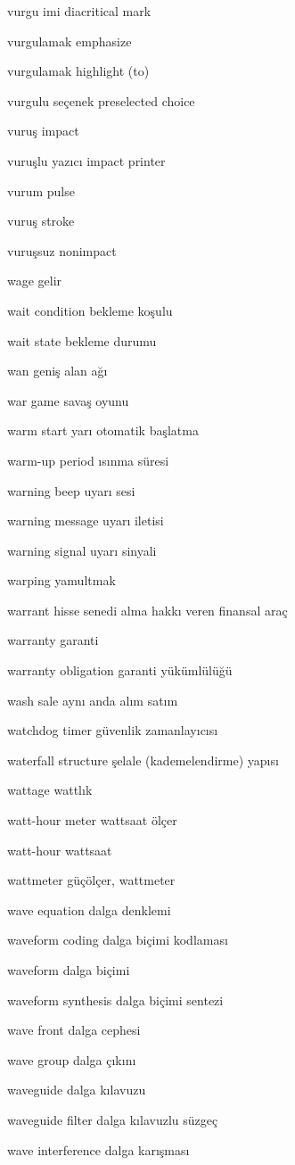 \documentclass[12pt,fleqn]{article}\usepackage{../../common}
\begin{document}
vurgu imi diacritical mark

vurgulamak emphasize

vurgulamak highlight (to)

vurgulu seçenek preselected choice

vuruş impact

vuruşlu yazıcı impact printer

vurum pulse

vuruş stroke

vuruşsuz nonimpact

wage gelir

wait condition bekleme koşulu

wait state bekleme durumu

wan geniş alan ağı

war game savaş oyunu

warm start yarı otomatik başlatma

warm-up period ısınma süresi

warning beep uyarı sesi

warning message uyarı iletisi

warning signal uyarı sinyali

warping yamultmak

warrant hisse senedi alma hakkı veren finansal araç

warranty garanti

warranty obligation garanti yükümlülüğü

wash sale aynı anda alım satım

watchdog timer güvenlik zamanlayıcısı

waterfall structure şelale (kademelendirme) yapısı

wattage wattlık

watt-hour meter wattsaat ölçer

watt-hour wattsaat

wattmeter güçölçer, wattmeter

wave equation dalga denklemi

waveform coding dalga biçimi kodlaması

waveform dalga biçimi

waveform synthesis dalga biçimi sentezi

wave front dalga cephesi

wave group dalga çıkını

waveguide dalga kılavuzu

waveguide filter dalga kılavuzlu süzgeç

wave interference dalga karışması
\end{document}

